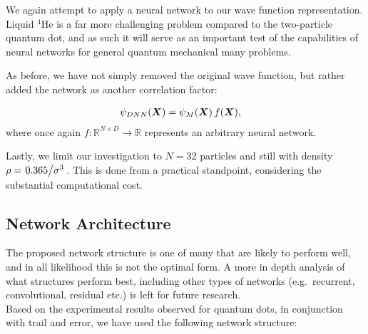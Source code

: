 \documentclass[Thesis.tex]{subfiles}
\begin{document}
We again attempt to apply a neural network to our wave function representation.
Liquid $^4$He is a far more challenging problem compared to the two-particle
quantum dot, and as such it will serve as an important test of the capabilities
of neural networks for general quantum mechanical many problems.

As before, we have not simply removed the original wave function, but rather
added the network as another correlation factor:

\begin{align}
  \label{eq:helium-dnn-mcmillan-def}
  \psi_{DNN}(\bm{X}) &= \psi_M(\bm{X})\,f(\bm{X}),
\end{align}
where once again $f: \mathbb{R}^{N\times D}\to\mathbb{R}$ represents an
arbitrary neural network. 

Lastly, we limit our investigation to $N=32$ particles and still with density
$\rho=\flatfrac{0.365}{\sigma^3}$. This is done from a practical standpoint,
considering the substantial computational cost.

\subsection{Network Architecture}

The proposed network structure is one of many that are likely to perform well,
and in all likelihood this is not the optimal form. A more in depth analysis of
what structures perform best, including other types of networks (e.g.\ recurrent,
convolutional, residual etc.) is left for future research.\\

Based on the experimental results observed for quantum dots, in conjunction with
trail and error, we have used the following network structure:
\end{document}
